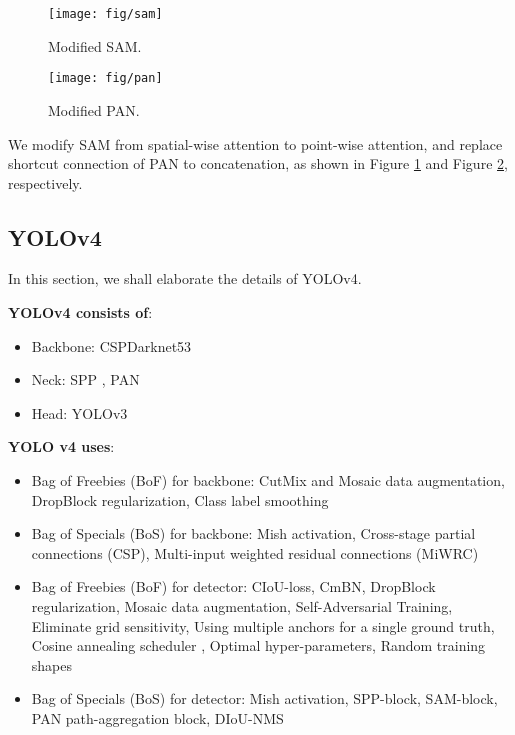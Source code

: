 \documentclass[10pt,twocolumn,letterpaper]{article}
\begin{document}
\begin{figure}[h]
	\begin{center}
		\texttt{[image: fig/sam]}
	\end{center}
    \vspace{-6mm}
	\caption{Modified SAM.  }
	\label{fig:sam}
\end{figure}

\begin{figure}[h]
	\begin{center}
		\texttt{[image: fig/pan]}
	\end{center}
    \vspace{-6mm}
	\caption{Modified PAN.  }
	\label{fig:pan}
\end{figure}

We modify SAM from spatial-wise attention to point-wise attention, and replace shortcut connection of PAN to concatenation, as shown in Figure \ref{fig:sam} and Figure \ref{fig:pan}, respectively.

\subsection{YOLOv4}

In this section, we shall elaborate the details of YOLOv4.

\vspace{4mm}

\textbf{YOLOv4 consists of}:

\begin{itemize}
	\item Backbone: CSPDarknet53 \cite{wang2020cspnet} \\
	\vspace{-2mm}
	\item Neck: SPP \cite{he2015spatial}, PAN \cite{liu2018path} \\
	\vspace{-2mm}
	\item Head: YOLOv3 \cite{redmon2018yolov3} \\
\end{itemize}

\textbf{YOLO v4 uses}:

\begin{itemize}
	\item Bag of Freebies (BoF) for backbone: CutMix and Mosaic data augmentation, DropBlock regularization, Class label smoothing
	\item Bag of Specials (BoS) for backbone: Mish activation, Cross-stage partial connections (CSP), Multi-input weighted residual connections (MiWRC)
	\item Bag of Freebies (BoF) for detector: CIoU-loss, CmBN, DropBlock regularization, Mosaic data augmentation, Self-Adversarial Training, Eliminate grid sensitivity, Using multiple anchors for a single ground truth, Cosine annealing scheduler \cite{loshchilov2016sgdr}, Optimal hyper-parameters, Random training shapes
	\item Bag of Specials (BoS) for detector: Mish activation, SPP-block, SAM-block, PAN  path-aggregation block, DIoU-NMS
\end{itemize}
\end{document}
